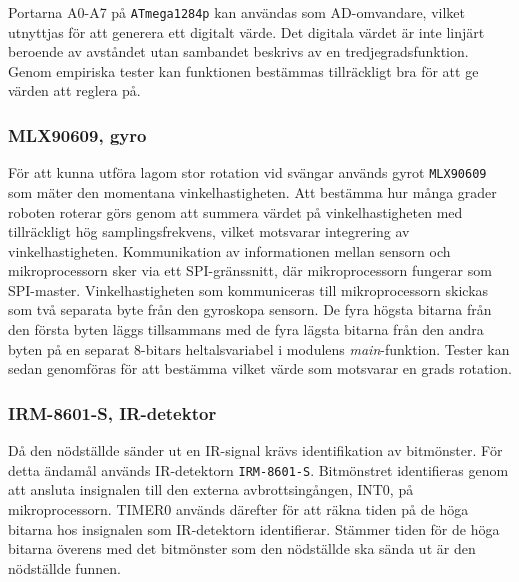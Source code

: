 \documentclass[11pt]{article}
\begin{document}
\begin{flushleft}
Portarna A0-A7 på \verb+ATmega1284p+ kan användas som AD-omvandare, vilket utnyttjas för att generera ett digitalt värde. Det digitala värdet är inte linjärt beroende av avståndet utan sambandet beskrivs av en tredjegradsfunktion. Genom empiriska tester kan funktionen bestämmas tillräckligt bra för att ge värden att reglera på.

\subsubsection{MLX90609, gyro}
För att kunna utföra lagom stor rotation vid svängar används gyrot \verb+MLX90609+ som mäter den momentana vinkelhastigheten. Att bestämma hur många grader roboten roterar görs genom att summera värdet på vinkelhastigheten med tillräckligt hög samplingsfrekvens, vilket motsvarar integrering av vinkelhastigheten. Kommunikation av informationen mellan sensorn och mikroprocessorn sker via ett SPI-gränssnitt, där mikroprocessorn fungerar som SPI-master. Vinkelhastigheten som kommuniceras till mikroprocessorn skickas som två separata byte från den gyroskopa sensorn. De fyra högsta bitarna från den första byten läggs tillsammans med de fyra lägsta bitarna från den andra byten på en separat 8-bitars heltalsvariabel i modulens \textit{main}-funktion. Tester kan sedan genomföras för att bestämma vilket värde som motsvarar en grads rotation. 


\subsubsection{IRM-8601-S, IR-detektor}
Då den nödställde sänder ut en IR-signal krävs identifikation av bitmönster. För detta ändamål används IR-detektorn \verb+IRM-8601-S+. Bitmönstret identifieras genom att ansluta insignalen till den externa avbrottsingången, INT0, på mikroprocessorn. TIMER0 används därefter för att räkna tiden på de höga bitarna hos insignalen som IR-detektorn identifierar. Stämmer tiden för de höga bitarna överens med det bitmönster som den nödställde ska sända ut är den nödställde funnen.


\end{flushleft}
\end{document}
